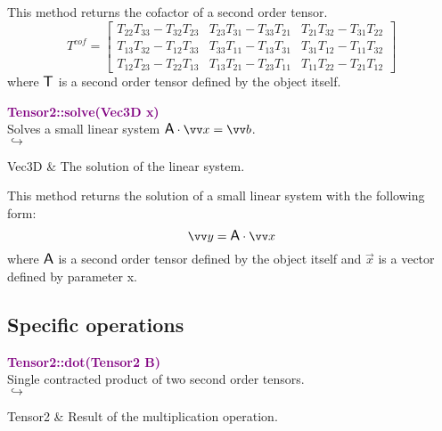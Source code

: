 This method returns the cofactor of a second order tensor.
\begin{equation*}
T^{cof} = \left[\begin{array}{ccc}
T_{22}T_{33}-T_{32}T_{23} & T_{23}T_{31}-T_{33}T_{21} & T_{21}T_{32}-T_{31}T_{22}\\
T_{13}T_{32}-T_{12}T_{33} & T_{33}T_{11}-T_{13}T_{31} & T_{31}T_{12}-T_{11}T_{32}\\
T_{12}T_{23}-T_{22}T_{13} & T_{13}T_{21}-T_{23}T_{11} & T_{11}T_{22}-T_{21}T_{12}
\end{array}
\right]
\end{equation*}
where $\mbox{\large\ensuremath{\mathsf{T}}}$ is a second order tensor defined by the object itself.

\textcolor{purple}{\textbf{Tensor2::solve(Vec3D x)}}\label{Tensor2::solve(Vec3D x)}\\
Solves a small linear system $\A\cdot \overrightarrow{x} = \overrightarrow{b}$.\\ \hspace*{5mm}$\hookrightarrow$
\vspace*{-2em}\begin{tcolorbox}[grow to left by=-1cm, width=\textwidth-1cm,myArgs,tabularx={l|R}]
Vec3D & The solution of the linear system.
\end{tcolorbox}

This method returns the solution of a small linear system with the following form:
\begin{equation*}
\overrightarrow{y} = \A \cdot \overrightarrow{x}
\end{equation*}
where $\mbox{\large\ensuremath{\mathsf{A}}}$ is a second order tensor defined by the object itself and $\overrightarrow{x}$ is a vector defined by parameter x.

\subsection{Specific operations}

\textcolor{purple}{\textbf{Tensor2::dot(Tensor2 B)}}\label{Tensor2::dot(Tensor2 B)}\\
Single contracted product of two second order tensors.\\ \hspace*{5mm}$\hookrightarrow$
\vspace*{-2em}\begin{tcolorbox}[grow to left by=-1cm, width=\textwidth-1cm,myArgs,tabularx={l|R}]
Tensor2 & Result of the multiplication operation.
\end{tcolorbox}

